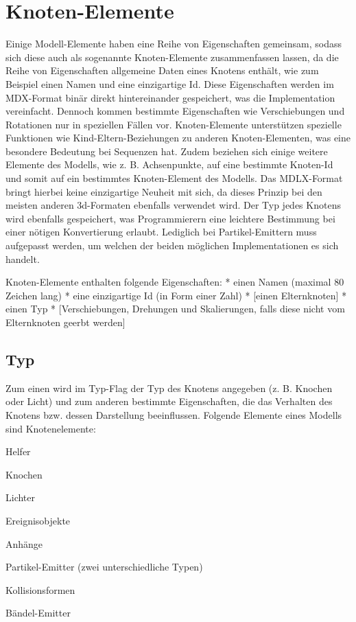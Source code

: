\section{Knoten-Elemente}
Einige Modell-Elemente haben eine Reihe von Eigenschaften gemeinsam, sodass sich diese auch als sogenannte Knoten-Elemente zusammenfassen lassen, da die Reihe von Eigenschaften allgemeine Daten eines Knotens enthält, wie zum Beispiel einen Namen und eine einzigartige Id. Diese Eigenschaften werden im MDX-Format binär direkt hintereinander gespeichert, was die Implementation vereinfacht.
Dennoch kommen bestimmte Eigenschaften wie Verschiebungen und Rotationen nur in speziellen Fällen vor.
Knoten-Elemente unterstützen spezielle Funktionen wie Kind-Eltern-Beziehungen zu anderen Knoten-Elementen, was eine besondere Bedeutung bei Sequenzen hat.
Zudem beziehen sich einige weitere Elemente des Modells, wie z. B. Achsenpunkte, auf eine bestimmte Knoten-Id und somit auf ein bestimmtes Knoten-Element des Modells.
Das MDLX-Format bringt hierbei keine einzigartige Neuheit mit sich, da dieses Prinzip bei den meisten
anderen 3d-Formaten ebenfalls verwendet wird.
Der Typ jedes Knotens wird ebenfalls gespeichert, was Programmierern eine leichtere Bestimmung bei einer
nötigen Konvertierung erlaubt.
Lediglich bei Partikel-Emittern muss aufgepasst werden, um welchen der beiden möglichen Implementationen
es sich handelt.

Knoten-Elemente enthalten folgende Eigenschaften:
* einen Namen (maximal 80 Zeichen lang)
* eine einzigartige Id (in Form einer Zahl)
* [einen Elternknoten]
* einen Typ
* [Verschiebungen, Drehungen und Skalierungen, falls diese nicht vom Elternknoten geerbt werden]

\subsection{Typ}
Zum einen wird im Typ-Flag der Typ des Knotens angegeben (z. B. Knochen oder Licht) und zum anderen bestimmte Eigenschaften,
die das Verhalten des Knotens bzw. dessen Darstellung beeinflussen.
Folgende Elemente eines Modells sind Knotenelemente:
\item Helfer
\item Knochen
\item Lichter
\item Ereignisobjekte
\item Anhänge
\item Partikel-Emitter (zwei unterschiedliche Typen)
\item Kollisionsformen
\item Bändel-Emitter

